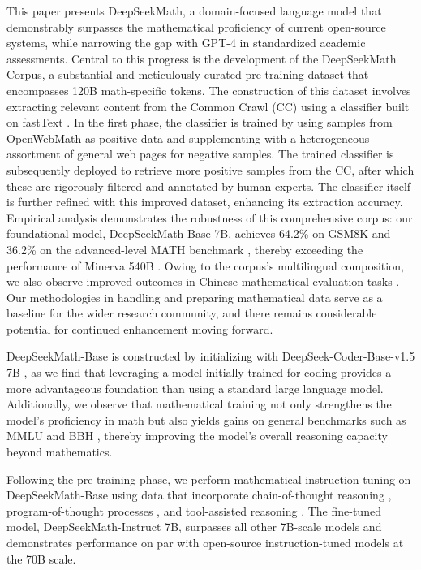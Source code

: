 This paper presents DeepSeekMath, a domain-focused language model that demonstrably surpasses the mathematical proficiency of current open-source systems, while narrowing the gap with GPT-4 in standardized academic assessments. Central to this progress is the development of the DeepSeekMath Corpus, a substantial and meticulously curated pre-training dataset that encompasses 120B math-specific tokens. The construction of this dataset involves extracting relevant content from the Common Crawl (CC) using a classifier built on fastText \citep{joulin2016fasttext}. In the first phase, the classifier is trained by using samples from OpenWebMath \citep{openwebmath} as positive data and supplementing with a heterogeneous assortment of general web pages for negative samples. The trained classifier is subsequently deployed to retrieve more positive samples from the CC, after which these are rigorously filtered and annotated by human experts. The classifier itself is further refined with this improved dataset, enhancing its extraction accuracy. Empirical analysis demonstrates the robustness of this comprehensive corpus: our foundational model, DeepSeekMath-Base 7B, achieves 64.2\% on GSM8K \citep{gsm8k} and 36.2\% on the advanced-level MATH benchmark \citep{MATH}, thereby exceeding the performance of Minerva 540B \citep{minerva}. Owing to the corpus’s multilingual composition, we also observe improved outcomes in Chinese mathematical evaluation tasks \citep{wei2023cmath,agieval}. Our methodologies in handling and preparing mathematical data serve as a baseline for the wider research community, and there remains considerable potential for continued enhancement moving forward.

DeepSeekMath-Base is constructed by initializing with DeepSeek-Coder-Base-v1.5 7B \citep{deepseek-coder}, as we find that leveraging a model initially trained for coding provides a more advantageous foundation than using a standard large language model. Additionally, we observe that mathematical training not only strengthens the model’s proficiency in math but also yields gains on general benchmarks such as MMLU \citep{mmlu} and BBH \citep{bbh}, thereby improving the model’s overall reasoning capacity beyond mathematics.

Following the pre-training phase, we perform mathematical instruction tuning on DeepSeekMath-Base using data that incorporate chain-of-thought reasoning \citep{cot}, program-of-thought processes \citep{pot,pal}, and tool-assisted reasoning \citep{tora}. The fine-tuned model, DeepSeekMath-Instruct 7B, surpasses all other 7B-scale models and demonstrates performance on par with open-source instruction-tuned models at the 70B scale.

